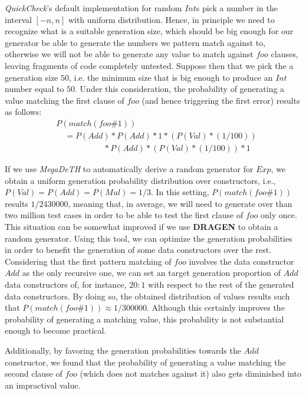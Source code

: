 \documentclass[conference, fleqn]{IEEEtran}
\newcommand{\Conid}[1]{\mathit{#1}}
\newcommand{\Varid}[1]{\mathit{#1}}
\newcommand{\quickcheck}{\emph{QuickCheck}\xspace}
\newcommand{\megadeth}{\emph{MegaDeTH}\xspace}
\newcommand{\dragen}{\textbf{DRAGEN}\xspace}
\begin{document}
\quickcheck's default implementation for random \ensuremath{\Conid{Int}}s pick a number in the
interval $[-n, n]$ with uniform distribution.
%
Hence, in principle we need to recognize what is a suitable generation size,
which should be big enough for our generator be able to generate the numbers we
pattern match against to, otherwise we will not be able to generate any value to
match against \ensuremath{\Varid{foo}} clauses, leaving fragments of code completely untested.
%
Suppose then that we pick the a generation size $50$, i.e. the minimum size that
is big enough to produce an \ensuremath{\Conid{Int}} number equal to $50$.
%
Under this consideration, the probability of generating a value matching the
first clause of \ensuremath{\Varid{foo}} (and hence triggering the first error) results as follows:
%
\begin{align*}
  &P(match(foo\#1))\\
  &\quad = P(Add)       * P(Add) * 1 * (P(Val) * (1/100)) \\
  &\phantom{xxxxxxxxxx} * P(Add) * (P(Val) * (1/100)) * 1
\end{align*}

If we use \megadeth to automatically derive a random generator for \ensuremath{\Conid{Exp}}, we
obtain a uniform generation probability distribution over constructors, i.e.,
$P(\ensuremath{\Conid{Val}}) = P(\ensuremath{\Conid{Add}}) = P(\ensuremath{\Conid{Mul}}) = 1/3$.
%
In this setting, $P(match(foo\#1))$ results $1/2430000$, meaning that, in
average, we will need to generate over than two million test cases in order to
be able to test the first clause of \ensuremath{\Varid{foo}} only once.
%
This situation can be somewhat improved if we use \dragen to obtain a random
generator.
%
Using this tool, we can optimize the generation probabilities in order to
benefit the generation of some data constructors over the rest.
%
Considering that the first pattern matching of \ensuremath{\Varid{foo}} involves the data
constructor \ensuremath{\Conid{Add}} as the only recursive one, we can set an target generation
proportion of \ensuremath{\Conid{Add}} data constructors of, for instance, $20:1$ with respect to
the rest of the generated data constructors.
%
By doing so, the obtained distribution of values results such that
$P(match(foo\#1)) \approx 1/300000$.
%
Although this certainly improves the probability of generating a matching value,
this probability is not substantial enough to become practical.


Additionally, by favoring the generation probabilities towards the \ensuremath{\Conid{Add}}
constructor, we found that the probability of generating a value matching the
second clause of \ensuremath{\Varid{foo}} (which does not matches against it) also gets diminished
into an impractival value.
\end{document}
